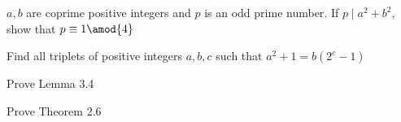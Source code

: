 \documentclass[11pt]{scrartcl}
\begin{document}
\begin{problem}
\(a,b\) are coprime positive integers and \(p\) is an odd prime number. If \(p \mid a^2 + b^2\), show that \(p\equiv 1 \amod{4}\)
\end{problem}
\begin{problem}
Find all triplets of positive integers \(a,b,c\) such that \(a^2+1=b(2^c-1)\)
\end{problem}
\begin{problem}
Prove Lemma 3.4
\end{problem}
\begin{problem}
Prove Theorem 2.6
\end{problem}
\end{document}
